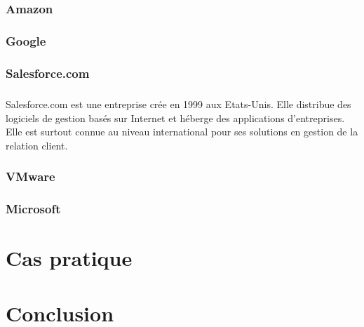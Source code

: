 \documentclass[a4paper,12pt]{report}
\begin{document}
\begin{onehalfspace}
	
	\subsection{Amazon}

	\subsection{Google}

	\subsection{Salesforce.com}

	\paragraph*{}
	Salesforce.com est une entreprise crée en 1999 aux Etats-Unis. Elle distribue des logiciels de gestion basés sur Internet et héberge des applications d'entreprises. Elle est surtout connue au niveau international pour ses solutions en gestion de la relation client.
	
	\subsection{VMware}


	\subsection{Microsoft}


	\chapter{Cas pratique}


	\chapter*{Conclusion}
	
	
	\tableofcontents
	\newpage

	\end{onehalfspace}
\end{document}
